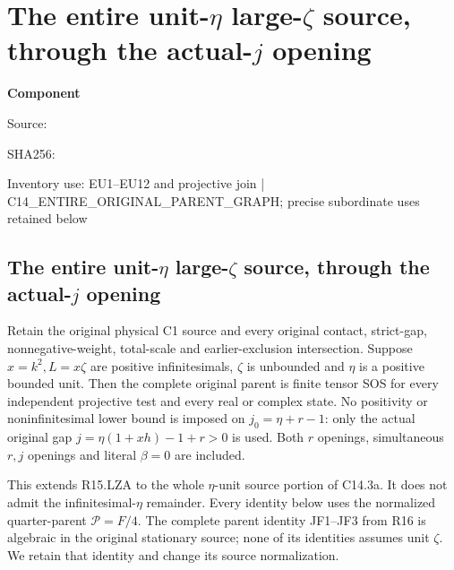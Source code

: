 \chapter{The entire unit-$\eta$ large-$\zeta$ source, through the actual-$j$ opening}
\label{component:p60eca5442075}
\noindent\textbf{Component }\par
{\small\noindent Source: \par}
{\small\noindent SHA256: \par}
{\small\noindent Inventory use: EU1--EU12 and projective join | C14\_\allowbreak{}ENTIRE\_\allowbreak{}ORIGINAL\_\allowbreak{}PARENT\_\allowbreak{}GRAPH; precise subordinate uses retained below\par}
\medskip
\section{The entire unit-$\eta$ large-$\zeta$ source, through the actual-$j$ opening}
\label{p60eca5442075:sec:r17-lz-unit-eta}

\begin{theorem}
Retain the original physical C1 source and every original contact,
strict-gap, nonnegative-weight, total-scale and earlier-exclusion
intersection. Suppose $x=k^2,L=x\zeta$ are positive infinitesimals,
$\zeta$ is unbounded and $\eta$ is a positive bounded unit.
Then the complete original parent is finite tensor SOS for every
independent projective test and every real or complex state.
No positivity or noninfinitesimal lower bound is imposed on
$j_0=\eta+r-1$: only the actual original gap
$j=\eta(1+xh)-1+r>0$ is used. Both $r$ openings, simultaneous
$r,j$ openings and literal $\beta=0$ are included.
\end{theorem}

This extends R15.LZA to the whole $\eta$-unit source portion of
C14.3a. It does not admit the infinitesimal-$\eta$ remainder.
Every identity below uses the normalized quarter-parent $\mathcal P=F/4$.
The complete parent identity JF1--JF3 from R16 is algebraic in the
original stationary source; none of its identities assumes unit
$\zeta$. We retain that identity and change its source normalization.

